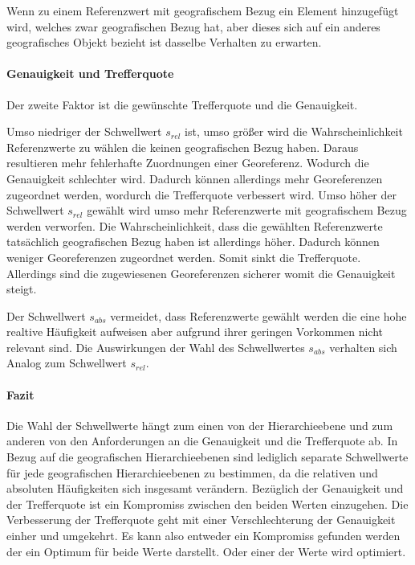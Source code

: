						Wenn zu einem Referenzwert mit geografischem Bezug ein Element hinzugefügt wird, welches zwar geografischen Bezug hat, aber dieses sich auf ein anderes geografisches Objekt bezieht ist dasselbe Verhalten zu erwarten.




\paragraph{Genauigkeit und Trefferquote} 

				Der zweite Faktor ist die gewünschte Trefferquote und die Genauigkeit.

				Umso niedriger der Schwellwert $s_{rel}$ ist, umso größer wird die Wahrscheinlichkeit Referenzwerte zu wählen die keinen geografischen Bezug haben.
				Daraus resultieren mehr fehlerhafte Zuordnungen einer Georeferenz.
				Wodurch die Genauigkeit schlechter wird.
				Dadurch können allerdings mehr Georeferenzen zugeordnet werden, wordurch die Trefferquote verbessert wird.
				Umso höher der Schwellwert $s_{rel}$ gewählt wird umso mehr Referenzwerte mit geografischem Bezug werden verworfen.
				Die Wahrscheinlichkeit, dass die gewählten Referenzwerte tatsächlich geografischen Bezug haben ist allerdings höher.
				Dadurch können weniger Georeferenzen zugeordnet werden.
				Somit sinkt die Trefferquote.
				Allerdings sind die zugewiesenen Georeferenzen sicherer womit die Genauigkeit steigt.

				Der Schwellwert $s_{abs}$ vermeidet, dass Referenzwerte gewählt werden die eine hohe realtive Häufigkeit aufweisen aber aufgrund ihrer geringen Vorkommen nicht relevant sind.
				Die Auswirkungen der Wahl des Schwellwertes $s_{abs}$ verhalten sich Analog zum Schwellwert $s_{rel}$.

			\paragraph{Fazit}

				Die Wahl der Schwellwerte hängt zum einen von der Hierarchieebene und zum anderen von den Anforderungen an die Genauigkeit und die Trefferquote ab.
				In Bezug auf die geografischen Hierarchieebenen sind lediglich separate Schwellwerte für jede geografischen Hierarchieebenen zu bestimmen, da die relativen und absoluten Häufigkeiten sich insgesamt verändern.
				Bezüglich der Genauigkeit und der Trefferquote ist ein Kompromiss zwischen den beiden Werten einzugehen. 
				Die Verbesserung der Trefferquote geht mit einer Verschlechterung der Genauigkeit einher und umgekehrt.
				Es kann also entweder ein Kompromiss gefunden werden der ein Optimum für beide Werte darstellt. 
				Oder einer der Werte wird optimiert.  


